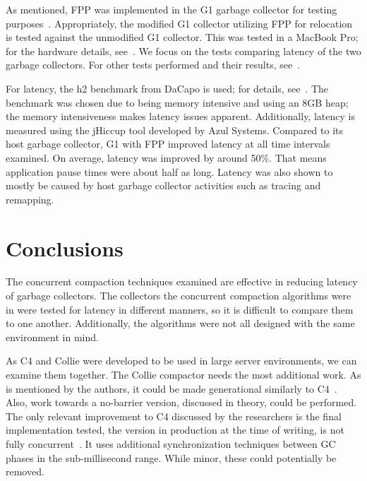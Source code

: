 \documentclass{sig-alternate}
\begin{document}

As mentioned, FPP was implemented in the G1 garbage collector for testing purposes~\cite{Osterlund:FPP}. 
Appropriately, the modified G1 collector utilizing FPP for relocation is tested against the
unmodified G1 collector. This was tested in a MacBook Pro; for the 
hardware details, see~\cite{Osterlund:FPP}. We focus on the tests comparing
latency of the two garbage collectors. For other tests performed and their results, see~\cite{Osterlund:FPP}.

For latency, the h2 benchmark from DaCapo is used; for details, see~\cite{Blackburn:DaCapo}.
The benchmark was chosen due to being memory intensive and using an 8GB heap;
the memory intensiveness makes latency issues apparent.
Additionally, latency is measured using the jHiccup tool developed by Azul Systems.
Compared to its host garbage collector, G1 with FPP improved latency at all time
intervals examined. On average, latency was improved by around 50\%. That means application
pause times were about half as long. Latency was also shown to mostly be caused by 
host garbage collector activities such as tracing and remapping.


\section{Conclusions}
\label{sec:conclusions}

The concurrent compaction techniques examined are effective in reducing latency of garbage collectors.
The collectors the concurrent compaction algorithms were in were tested for latency in
different manners, so it is difficult to compare them to one another. Additionally, the
algorithms were not all designed with the same environment in mind.

As C4 and Collie were developed to be used in large server environments, we can
examine them together.
The Collie compactor needs the most additional work. As is mentioned
by the authors, it could be made generational similarly to C4~\cite{Iyengar:Collie}. 
Also, work towards a no-barrier version, discussed in theory, could be performed.
The only relevant improvement to C4 discussed by the researchers is the
final implementation tested, the version in production at the time of writing,
is not fully concurrent~\cite{Tene:C4}. It uses additional synchronization techniques between
GC phases in the sub-millisecond range. While minor, these could potentially be removed.
\end{document}
